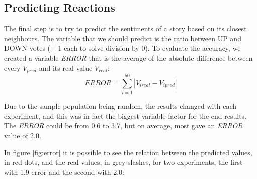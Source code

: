 \documentclass[a4paper,10pt]{article}
\begin{document}
\subsection{Predicting Reactions}
The final step is to try to predict the sentiments of a story based on its closest neighbours. The variable that we should predict is the ratio between UP and DOWN votes (+ 1 each to solve division by 0).
To evaluate the accuracy, we created a variable \emph{ERROR} that is the average of the absolute difference between every \begin{math}V_{pred}\end{math} and its real value \begin{math}V_{real}\end{math}:
\begin{equation}
ERROR = \sum_{i=1}^{50} | V_{i real} - V_{i pred} |
\end{equation}

Due to the sample population being random, the results changed with each experiment, and this was in fact the biggest variable factor for the end results. The \emph{ERROR} could be from 0.6 to 3.7, but on average, most gave an \emph{ERROR} value of 2.0.

In figure \ref{fig:error} it is possible to see the relation between the predicted values, in red dots, and the real values, in grey slashes, for two experiments, the first with 1.9 error and the second with 2.0:
\end{document}
